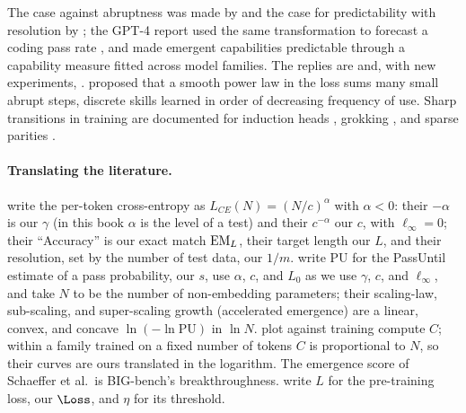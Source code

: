 \begin{refsection}
The case against abruptness was made by \textcite{SchaefferMirandaKoyejo2023} and the case for predictability with resolution by \textcite{HuEtAl2024}; the GPT-4 report used the same transformation to forecast a coding pass rate \parencite{OpenAI2023}, and \textcite{RuanMaddisonHashimoto2024} made emergent capabilities predictable through a capability measure fitted across model families. The replies are \textcite{Wei2023Blog} and, with new experiments, \textcite{DuEtAl2024}. \Textcite{MichaudEtAl2023} proposed that a smooth power law in the loss sums many small abrupt steps, discrete skills learned in order of decreasing frequency of use. Sharp transitions in training are documented for induction heads \parencite{OlssonEtAl2022}, grokking \parencite{PowerEtAl2022,NandaEtAl2023}, and sparse parities \parencite{BarakEtAl2022}.

\paragraph{Translating the literature.} \Textcite{SchaefferMirandaKoyejo2023} write the per-token cross-entropy as $L_{CE}(N)=(N/c)^\alpha$ with $\alpha<0$: their $-\alpha$ is our $\gamma$ (in this book $\alpha$ is the level of a test) and their $c^{-\alpha}$ our $c$, with $\ell_\infty=0$; their ``Accuracy'' is our exact match $\mathrm{EM}_L$, their target length our $L$, and their resolution, set by the number of test data, our $1/m$. \Textcite{HuEtAl2024} write PU for the PassUntil estimate of a pass probability, our $s$, use $\alpha$, $c$, and $L_0$ as we use $\gamma$, $c$, and $\ell_\infty$, and take $N$ to be the number of non-embedding parameters; their scaling-law, sub-scaling, and super-scaling growth (accelerated emergence) are a linear, convex, and concave $\ln(-\ln\mathrm{PU})$ in $\ln N$. \Textcite{WeiEtAl2022} plot against training compute $C$; within a family trained on a fixed number of tokens $C$ is proportional to $N$, so their curves are ours translated in the logarithm. The emergence score of Schaeffer et al.\ is BIG-bench's breakthroughness. \Textcite{DuEtAl2024} write $L$ for the pre-training loss, our $\Loss$, and $\eta$ for its threshold.

\printchapterbib
\end{refsection}
